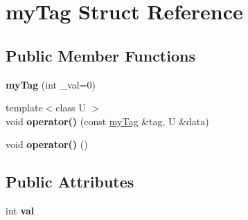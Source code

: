 \hypertarget{structmy_tag}{}\section{my\+Tag Struct Reference}
\label{structmy_tag}
\subsection*{Public Member Functions}
\begin{DoxyCompactItemize}
\item 
\mbox{\label{structmy_tag_a2b5a0eb9aae1aec2355f84a48d3bc31d}} 
{\bfseries my\+Tag} (int \+\_\+val=0)
\item 
\mbox{\label{structmy_tag_af960328b3aa0c843770c85cbf8698c3f}} 
{\footnotesize template$<$class U $>$ }\\void {\bfseries operator()} (const \mbox{\hyperlink{structmy_tag}{my\+Tag}} \&tag, U \&data)
\item 
\mbox{\label{structmy_tag_ace4e4e198aaebcbb1d7f636efe68c0ab}} 
void {\bfseries operator()} ()
\end{DoxyCompactItemize}
\subsection*{Public Attributes}
\begin{DoxyCompactItemize}
\item 
\mbox{\label{structmy_tag_a5a941363b2416c0f8278f13272daf3ae}} 
int {\bfseries val}
\end{DoxyCompactItemize}
